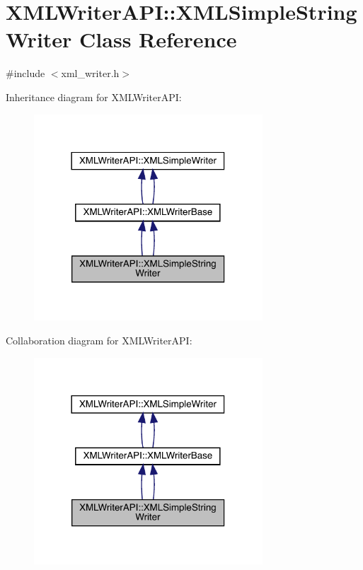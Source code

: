 \hypertarget{classXMLWriterAPI_1_1XMLSimpleStringWriter}{}\section{X\+M\+L\+Writer\+A\+PI\+:\+:X\+M\+L\+Simple\+String\+Writer Class Reference}
\label{classXMLWriterAPI_1_1XMLSimpleStringWriter}


{\ttfamily \#include $<$xml\+\_\+writer.\+h$>$}



Inheritance diagram for X\+M\+L\+Writer\+A\+PI\+:\nopagebreak
\begin{figure}[H]
\begin{center}
\leavevmode
\includegraphics[width=242pt]{d9/d7e/classXMLWriterAPI_1_1XMLSimpleStringWriter__inherit__graph}
\end{center}
\end{figure}


Collaboration diagram for X\+M\+L\+Writer\+A\+PI\+:\nopagebreak
\begin{figure}[H]
\begin{center}
\leavevmode
\includegraphics[width=242pt]{d6/d4b/classXMLWriterAPI_1_1XMLSimpleStringWriter__coll__graph}
\end{center}
\end{figure}
